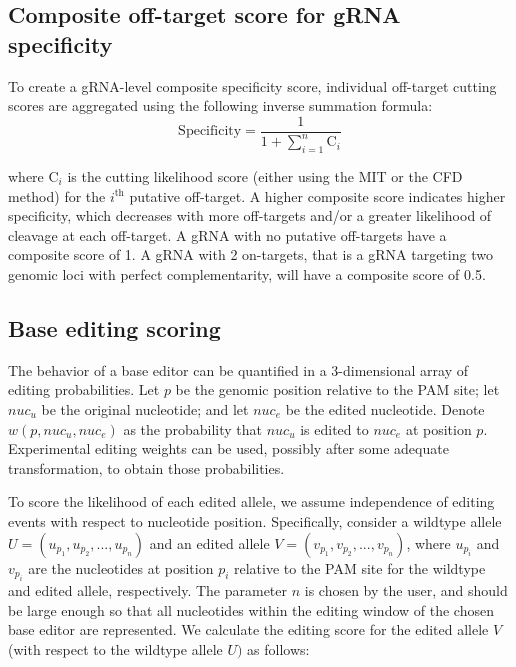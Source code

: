 \documentclass[pdftex,english,10pt]{article}
\begin{document}
{%
\subsection*{Composite off-target score for gRNA specificity}

To create a gRNA-level composite specificity score, individual off-target cutting scores are aggregated using the following inverse summation formula:
\begin{equation*}
\text{Specificity} = \frac{1}{1+\sum_{i=1}^n\text{C}_i}
\end{equation*}

where $\text{C}_i$ is the cutting likelihood score (either using the MIT or the CFD method) for the $i^{\text{th}}$ putative off-target. A higher composite score indicates higher specificity, which decreases with more off-targets and/or a greater likelihood of cleavage at each off-target. A gRNA with no putative off-targets have a composite score of 1. A gRNA with 2 on-targets, that is a gRNA targeting two genomic loci with perfect complementarity, will have a composite score of 0.5. 





\subsection*{Base editing scoring}


The behavior of a base editor can be quantified in a 3-dimensional array of editing probabilities. Let $p$ be the genomic position relative to the PAM site; let $nuc_u$ be the original nucleotide; and let $nuc_e$ be the edited nucleotide. Denote $w(p, nuc_u, nuc_e)$ as the probability that $nuc_u$ is edited to $nuc_e$ at position $p$. Experimental editing weights can be used, possibly after some adequate transformation, to obtain those probabilities. 

To score the likelihood of each edited allele, we assume independence of editing events with respect to nucleotide position. Specifically, consider a wildtype allele $U=(u_{p_1}, u_{p_2}, ..., u_{p_n})$ and an edited allele $V=(v_{p_1}, v_{p_2}, ..., v_{p_n})$, where $u_{p_i}$  and $v_{p_i}$ are the nucleotides at position $p_i$ relative to the PAM site for the wildtype and edited allele, respectively. The parameter $n$ is chosen by the user, and should be large enough so that all nucleotides within the editing window of the chosen base editor are represented.  We calculate the editing score for the edited allele $V$ (with respect to the wildtype allele $U)$ as follows:

}
\end{document}
